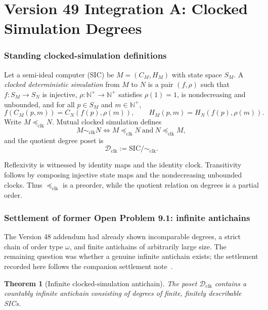 \documentclass[11pt]{article}
\newtheorem{theorem}[definition]{Theorem}
\theoremstyle{remark}
\newcommand{\Npos}{\mathbb N^{+}}
\newcommand{\Dclk}{\mathcal D_{\mathrm{clk}}}
\newcommand{\preclk}{\preceq_{\mathrm{clk}}}
\newcommand{\simclk}{\sim_{\mathrm{clk}}}
\begin{document}
\part*{Version 49 Integration A: Clocked Simulation Degrees}

\section{Standing clocked-simulation definitions}

Let a semi-ideal computer (SIC) be \(M=(C_M,H_M)\) with state space \(S_M\).
A \emph{clocked deterministic simulation} from \(M\) to \(N\) is a pair \((f,\rho)\) such that
\(f:S_M\to S_N\) is injective,
\(\rho:\Npos\to\Npos\) satisfies \(\rho(1)=1\), is nondecreasing and unbounded, and
for all \(p\in S_M\) and \(m\in\Npos\),
\[
f(C_M(p,m))=C_N(f(p),\rho(m)),
\qquad
H_M(p,m)=H_N(f(p),\rho(m)).
\]
Write \(M\preclk N\).
Mutual clocked simulation defines
\[
M\simclk N
\iff
M\preclk N\ \text{and}\ N\preclk M,
\]
and the quotient degree poset is
\[
\Dclk := \mathrm{SIC}/\!\simclk .
\]

Reflexivity is witnessed by identity maps and the identity clock.
Transitivity follows by composing injective state maps and the nondecreasing unbounded clocks.
Thus \(\preclk\) is a preorder, while the quotient relation on degrees is a partial order.

\section{Settlement of former Open Problem 9.1: infinite antichains}

The Version 48 addendum had already shown incomparable degrees, a strict chain of order type
\(\omega\), and finite antichains of arbitrarily large size.
The remaining question was whether a genuine infinite antichain exists; the settlement recorded here
follows the companion settlement note~\cite{TennesonSettlements}.

\begin{theorem}[Infinite clocked-simulation antichain]\label{thm:inf-antichain}
The poset \(\Dclk\) contains a countably infinite antichain consisting of degrees of finite,
finitely describable SICs.
\end{theorem}
\end{document}
